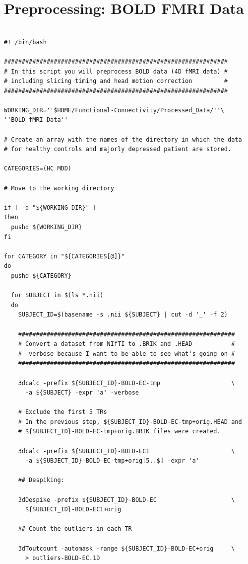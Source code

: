 \documentclass[12pt]{article}
\begin{document}
\section{Preprocessing: BOLD FMRI Data}%
\label{sec:preprocessing_of_bold_data}

\begin{verbatim}

#! /bin/bash

###############################################################
# In this script you will preprocess BOLD data (4D fMRI data) #
# including slicing timing and head motion correction         #
###############################################################

WORKING_DIR=''$HOME/Functional-Connectivity/Processed_Data/''\
''BOLD_fMRI_Data''

# Create an array with the names of the directory in which the data
# for healthy controls and majorly depressed patient are stored.

CATEGORIES=(HC MDD)

# Move to the working directory

if [ -d "${WORKING_DIR}" ]
then
  pushd ${WORKING_DIR}
fi

for CATEGORY in "${CATEGORIES[@]}"
do
  pushd ${CATEGORY}

  for SUBJECT in $(ls *.nii)
  do
    SUBJECT_ID=$(basename -s .nii ${SUBJECT} | cut -d '_' -f 2)

    #############################################################
    # Convert a dataset from NIfTI to .BRIK and .HEAD           #
    # -verbose because I want to be able to see what's going on #
    #############################################################

    3dcalc -prefix ${SUBJECT_ID}-BOLD-EC-tmp                    \
      -a ${SUBJECT} -expr 'a' -verbose

    # Exclude the first 5 TRs
    # In the previous step, ${SUBJECT_ID}-BOLD-EC-tmp+orig.HEAD and
    # ${SUBJECT_ID}-BOLD-EC-tmp+orig.BRIK files were created.

    3dcalc -prefix ${SUBJECT_ID}-BOLD-EC1                       \
      -a ${SUBJECT_ID}-BOLD-EC-tmp+orig[5..$] -expr 'a'

    ## Despiking:

    3dDespike -prefix ${SUBJECT_ID}-BOLD-EC                     \
      ${SUBJECT_ID}-BOLD-EC1+orig

    ## Count the outliers in each TR

    3dToutcount -automask -range ${SUBJECT_ID}-BOLD-EC+orig     \
      > outliers-BOLD-EC.1D


\end{verbatim}
\end{document}
